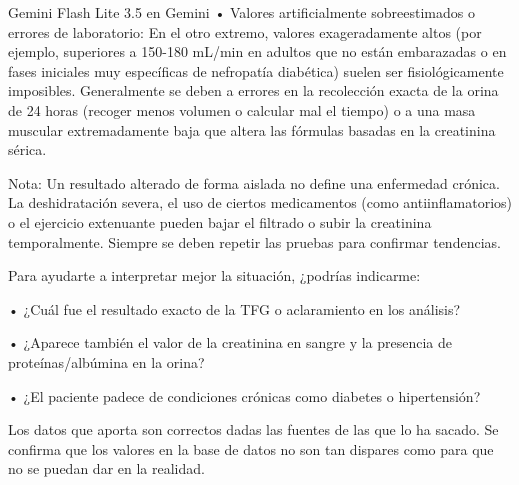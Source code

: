 \documentclass[12pt,a4paper,oneside]{book}
\begin{document}
\begin{iaresp} {Gemini Flash Lite 3.5 en Gemini}
• Valores artificialmente sobreestimados o errores de laboratorio: En el otro extremo, valores exageradamente altos (por ejemplo, superiores a 150-180 mL/min en adultos que no están embarazadas o en fases iniciales muy específicas de nefropatía diabética) suelen ser fisiológicamente imposibles. Generalmente se deben a errores en la recolección exacta de la orina de 24 horas (recoger menos volumen o calcular mal el tiempo) o a una masa muscular extremadamente baja que altera las fórmulas basadas en la creatinina sérica.

Nota: Un resultado alterado de forma aislada no define una enfermedad crónica. La deshidratación severa, el uso de ciertos medicamentos (como antiinflamatorios) o el ejercicio extenuante pueden bajar el filtrado o subir la creatinina temporalmente. Siempre se deben repetir las pruebas para confirmar tendencias.

Para ayudarte a interpretar mejor la situación, ¿podrías indicarme:

• ¿Cuál fue el resultado exacto de la TFG o aclaramiento en los análisis?

• ¿Aparece también el valor de la creatinina en sangre y la presencia de proteínas/albúmina en la orina?

• ¿El paciente padece de condiciones crónicas como diabetes o hipertensión?
\end{iaresp}
\begin{iaanalisis}
Los datos que aporta son correctos dadas las fuentes de las que lo ha sacado. Se confirma que los valores en la base de datos no son tan dispares como para que no se puedan dar en la realidad.
\end{iaanalisis}
\end{document}
